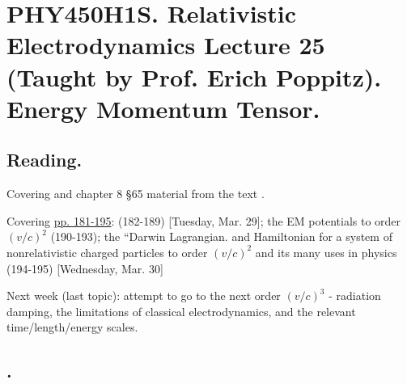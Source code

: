 
%

\chapter{PHY450H1S.  Relativistic Electrodynamics Lecture 25 (Taught by Prof. Erich Poppitz).  Energy Momentum Tensor.}
\label{chap:relativisticElectrodynamicsL25}
{}
\date{Mar 31, 2011}

\beginArtNoToc

\section{Reading.}

Covering and chapter 8 \S 65 material from the text \cite{landau1980classical}.

Covering \href{http://www.physics.utoronto.ca/~poppitz/epoppitz/PHY450_files/RelEMpp181-195.pdf}{pp. 181-195}: (182-189) [Tuesday, Mar. 29]; the EM potentials to order $(v/c)^2$ (190-193); the ``Darwin Lagrangian.  and Hamiltonian for a system of nonrelativistic charged particles to order $(v/c)^2$ and its many uses in physics (194-195) [Wednesday, Mar. 30]

Next week (last topic): attempt to go to the next order $(v/c)^3$ - radiation damping, the limitations of classical electrodynamics, and the relevant time/length/energy scales.

\section{.}

\EndArticle
